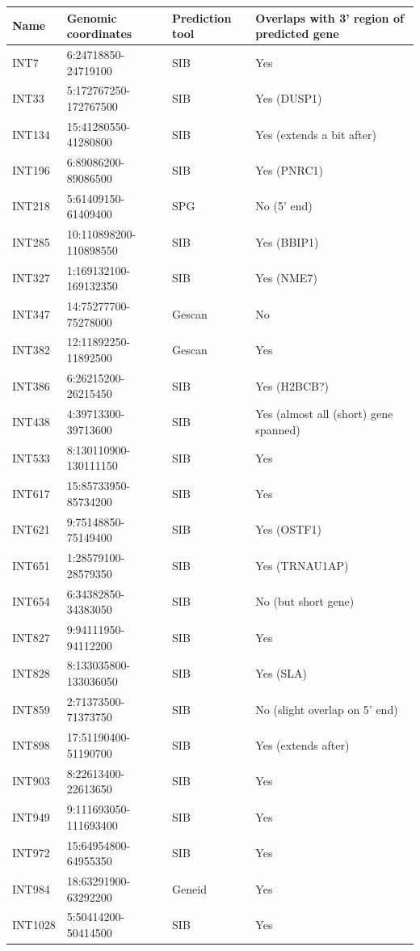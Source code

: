 \begin{table}[htbp]
    \tiny
    \centering
    \begin{tabular}{llll}
        \toprule
        Name & Genomic coordinates & Prediction tool & Overlaps with 3' region of predicted gene \\
        \midrule
	INT7 & 6:24718850-24719100 & SIB & Yes \\
	INT33 & 5:172767250-172767500 & SIB & Yes (DUSP1) \\
	INT134 & 15:41280550-41280800 & SIB & Yes (extends a bit after) \\
	INT196 & 6:89086200-89086500 & SIB & Yes (PNRC1) \\
	INT218 & 5:61409150-61409400 & SPG & No (5' end) \\
	INT285 & 10:110898200-110898550 & SIB & Yes (BBIP1) \\
	INT327 & 1:169132100-169132350 & SIB & Yes (NME7) \\
	INT347 & 14:75277700-75278000 & Gescan & No \\
	INT382 & 12:11892250-11892500 & Gescan & Yes \\
	INT386 & 6:26215200-26215450 & SIB & Yes (H2BCB?) \\
	INT438 & 4:39713300-39713600 & SIB & Yes (almost all (short) gene spanned) \\
	INT533 & 8:130110900-130111150 & SIB & Yes \\
	INT617 & 15:85733950-85734200 & SIB & Yes \\
	INT621 & 9:75148850-75149400 & SIB & Yes (OSTF1) \\
	INT651 & 1:28579100-28579350 & SIB & Yes (TRNAU1AP) \\
	INT654 & 6:34382850-34383050 & SIB & No (but short gene)\\
	INT827 & 9:94111950-94112200 & SIB & Yes \\
	INT828 & 8:133035800-133036050 & SIB & Yes (SLA) \\
	INT859 & 2:71373500-71373750 & SIB & No (slight overlap on 5' end) \\
	INT898 & 17:51190400-51190700 & SIB & Yes (extends after)\\
	INT903 & 8:22613400-22613650 & SIB & Yes \\
	INT949 & 9:111693050-111693400 & SIB & Yes \\
	INT972 & 15:64954800-64955350 & SIB & Yes \\
	INT984 & 18:63291900-63292200 & Geneid & Yes \\
	INT1028 & 5:50414200-50414500 & SIB & Yes \\

\end{tabular}
\end{table}
